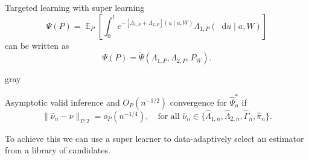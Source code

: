 \documentclass[smaller]{beamer}\usepackage{listings}
\newcommand{\E}{{\ensuremath{\mathop{{\mathbb{E}}}}}}
\newcommand*\diff{\mathop{}\!\mathrm{d}}
\newcommand\smallO{\textit{o}}
\newcommand\bigO{\textit{O}}
\newcommand{\1}{\mathds{1}}
\newcommand{\empmeas}{\ensuremath{\mathbb{P}_n}} %
\begin{document}
\begin{frame}[label={sec:org2118e05}]{Targeted learning with super learning}
\begin{equation*}
  \Psi(P) = \E_{P}{
    \left[
      \int_0^t e^{-[\Lambda_{1,P}+\Lambda_{2,P}](u \mid
        a, W)} \Lambda_{1,P}(\diff u \mid a, W)
    \right]}  
\end{equation*}
can be written as
\begin{equation*}
  \Psi(P) = \tilde{\Psi}(\Lambda_{1,P}, \Lambda_{2,P}, P_W).
\end{equation*}

\vfill

\begin{beamercolorbox}[rounded=true]{gray}
\begin{center}
\end{center}
\end{beamercolorbox}

\begin{block}{}
Asymptotic valid inference and \(\bigO_P(n^{-1/2})\) convergence
for \(\hat{\Psi}_n^*\) if
\begin{equation*}
  \| \hat{\nu}_n - \nu \|_{P,2} = \smallO_P{(n^{-1/4})},
  \quad \text{for all } \hat{\nu}_n \in
  \{ \hat{\Lambda}_{1,n}, \hat{\Lambda}_{2,n}, \hat{\Gamma}_n,
  \hat{\pi}_n \}.
\end{equation*}

\vfill

To achieve this we can use a super learner to data-adaptively
select an estimator from a library of candidates.
\end{block}
\end{frame}
\end{document}
